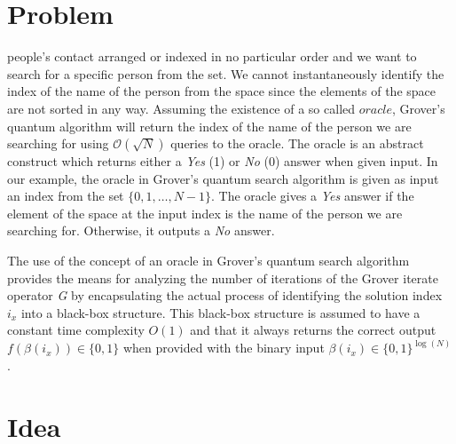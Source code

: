 

\section{Problem}
people's contact  arranged or indexed in no particular order and we want to search for a specific person from the set. We cannot instantaneously identify the index of the name of the person from the space since the elements of the space are not sorted in any way. Assuming the existence of a so called $\textit{oracle}$, Grover's quantum algorithm will return the index of the name of the person we are searching for using $\mathcal{O}\left(\sqrt{N}\right)$ queries to the oracle. The oracle is an abstract construct which returns either a \textit{Yes} (1) or \textit{No} (0) answer when given input. In our example, the oracle in Grover's quantum search algorithm is given as input an index from the set $\{0, 1, \ldots, N-1\}$. The oracle gives a \textit{Yes} answer if the element of the space at the input index is the name of the person we are searching for. Otherwise, it outputs a \textit{No} answer.

The use of the concept of an oracle in Grover's quantum search algorithm provides the means for analyzing the number of iterations of the Grover iterate operator \textit{G} by encapsulating the actual process of identifying the solution index $i_x$ into a black-box structure. This black-box structure is assumed to have a constant time complexity $O(1)$ and that it always returns the correct output $f(\beta(i_x)) \in \{0,1\}$ when provided with the binary input $\beta(i_x) \in \{0,1\}^{\log(N)}$.


\section{Idea}

